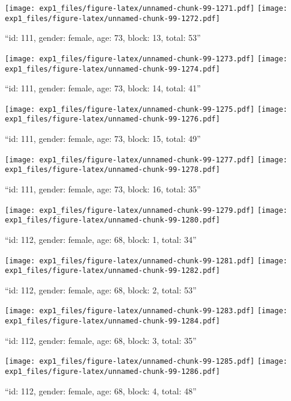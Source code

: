 \documentclass[,]{article}
\begin{document}
\texttt{[image: exp1\_files/figure-latex/unnamed-chunk-99-1271.pdf]}
\texttt{[image: exp1\_files/figure-latex/unnamed-chunk-99-1272.pdf]}

\newpage
[1] 

``id: 111, gender: female, age: 73, block: 13, total: 53''

\texttt{[image: exp1\_files/figure-latex/unnamed-chunk-99-1273.pdf]}
\texttt{[image: exp1\_files/figure-latex/unnamed-chunk-99-1274.pdf]}

\newpage
[1] 

``id: 111, gender: female, age: 73, block: 14, total: 41''

\texttt{[image: exp1\_files/figure-latex/unnamed-chunk-99-1275.pdf]}
\texttt{[image: exp1\_files/figure-latex/unnamed-chunk-99-1276.pdf]}

\newpage
[1] 

``id: 111, gender: female, age: 73, block: 15, total: 49''

\texttt{[image: exp1\_files/figure-latex/unnamed-chunk-99-1277.pdf]}
\texttt{[image: exp1\_files/figure-latex/unnamed-chunk-99-1278.pdf]}

\newpage
[1] 

``id: 111, gender: female, age: 73, block: 16, total: 35''

\texttt{[image: exp1\_files/figure-latex/unnamed-chunk-99-1279.pdf]}
\texttt{[image: exp1\_files/figure-latex/unnamed-chunk-99-1280.pdf]}

\newpage
[1] 

``id: 112, gender: female, age: 68, block: 1, total: 34''

\texttt{[image: exp1\_files/figure-latex/unnamed-chunk-99-1281.pdf]}
\texttt{[image: exp1\_files/figure-latex/unnamed-chunk-99-1282.pdf]}

\newpage
[1] 

``id: 112, gender: female, age: 68, block: 2, total: 53''

\texttt{[image: exp1\_files/figure-latex/unnamed-chunk-99-1283.pdf]}
\texttt{[image: exp1\_files/figure-latex/unnamed-chunk-99-1284.pdf]}

\newpage
[1] 

``id: 112, gender: female, age: 68, block: 3, total: 35''

\texttt{[image: exp1\_files/figure-latex/unnamed-chunk-99-1285.pdf]}
\texttt{[image: exp1\_files/figure-latex/unnamed-chunk-99-1286.pdf]}

\newpage
[1] 

``id: 112, gender: female, age: 68, block: 4, total: 48''
\end{document}
